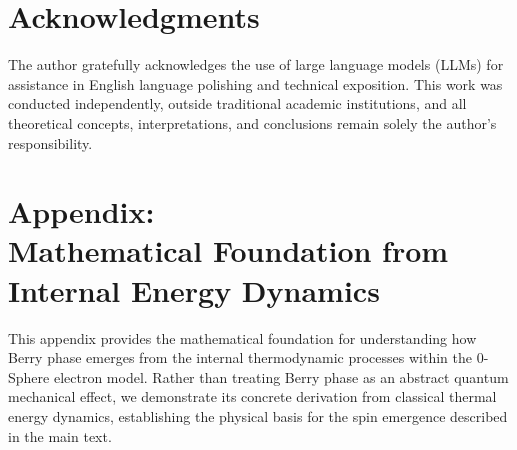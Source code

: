 \documentclass[%
 reprint,
 amsmath,amssymb,
 aps,
]{revtex4-1}
\numberwithin{equation}{section}%
\begin{document}
\section*{Acknowledgments}
The author gratefully acknowledges the use of large language models (LLMs) for assistance in English language polishing and technical exposition. This work was conducted independently, outside traditional academic institutions, and all theoretical concepts, interpretations, and conclusions remain solely the author’s responsibility.

\section{Appendix:\\ Mathematical Foundation from Internal Energy Dynamics}
\label{sec:appendix}

This appendix provides the mathematical foundation for understanding how Berry phase emerges from the internal thermodynamic processes within the 0-Sphere electron model. Rather than treating Berry phase as an abstract quantum mechanical effect, we demonstrate its concrete derivation from classical thermal energy dynamics, establishing the physical basis for the spin emergence described in the main text.
\end{document}

